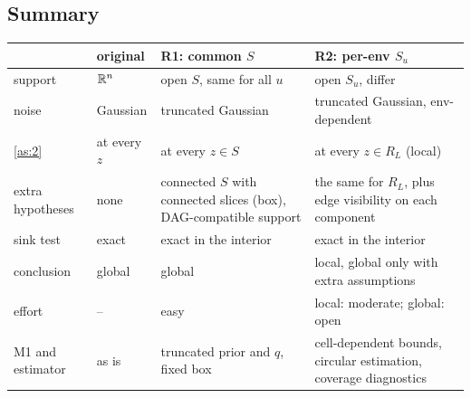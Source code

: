 \subsection{Summary}
\label{app:support:summary}
{
\renewcommand{\arraystretch}{1.3}
\begin{center}
\small
\begin{tabular}{@{}p{2.6cm}p{3.6cm}L{3.6cm}L{4.2cm}@{}}
\toprule
 & original & R1: common $S$ & R2: per-env $S_u$\\
\midrule
support & $\mathbb{R}^n$ & open $S$, same for all $u$ & open $S_u$, differ\\
noise & Gaussian & truncated Gaussian & truncated Gaussian, env-dependent\\
\cref{as:2} & at every $z$ & at every $z\in S$ & at every $z\in R_L$ (local)\\
extra hypotheses & none & connected $S$ with connected slices (box), DAG-compatible support & the same for $R_L$, plus edge visibility on each component\\
sink test & exact & exact in the interior & exact in the interior\\
conclusion & global & global & local, global only with extra assumptions\\
effort & -- & easy & local: moderate; global: open\\
M1 and estimator & as is & truncated prior and $q$, fixed box & cell-dependent bounds, circular estimation, coverage diagnostics\\
\bottomrule
\end{tabular}
\end{center}
}
